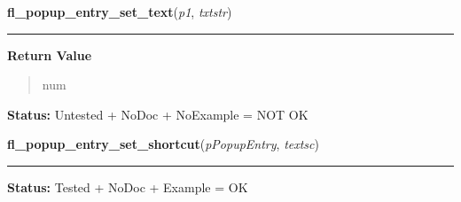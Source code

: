     \label{xformslib:library:fl_popup_entry_set_text}

    \vspace{0.5ex}

\hspace{.8\funcindent}\begin{boxedminipage}{\funcwidth}

    \raggedright \textbf{fl\_popup\_entry\_set\_text}(\textit{p1}, \textit{txtstr})

    \vspace{-1.5ex}

    \rule{\textwidth}{0.5\fboxrule}
\setlength{\parskip}{2ex}
\setlength{\parskip}{1ex}
      \textbf{Return Value}
    \vspace{-1ex}

      \begin{quote}
      num

      \end{quote}

\textbf{Status:} Untested + NoDoc + NoExample = NOT OK



    \end{boxedminipage}

    \label{xformslib:library:fl_popup_entry_set_shortcut}

    \vspace{0.5ex}

\hspace{.8\funcindent}\begin{boxedminipage}{\funcwidth}

    \raggedright \textbf{fl\_popup\_entry\_set\_shortcut}(\textit{pPopupEntry}, \textit{textsc})

    \vspace{-1.5ex}

    \rule{\textwidth}{0.5\fboxrule}
\setlength{\parskip}{2ex}
\setlength{\parskip}{1ex}
\textbf{Status:} Tested + NoDoc + Example = OK



    \end{boxedminipage}

    \label{xformslib:library:fl_popup_entry_set_value}

